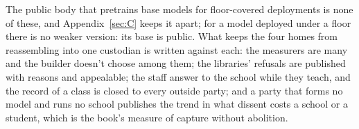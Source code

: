 The public body that pretrains base models for floor-covered deployments is none of these, and Appendix~\ref{sec:C} keeps it apart; for a model deployed under a floor there is no weaker version: its base is public. What keeps the four homes from reassembling into one custodian is written against each: the measurers are many and the builder doesn't choose among them; the libraries' refusals are published with reasons and appealable; the staff answer to the school while they teach, and the record of a class is closed to every outside party; and a party that forms no model and runs no school publishes the trend in what dissent costs a school or a student, which is the book's measure of capture without abolition.
